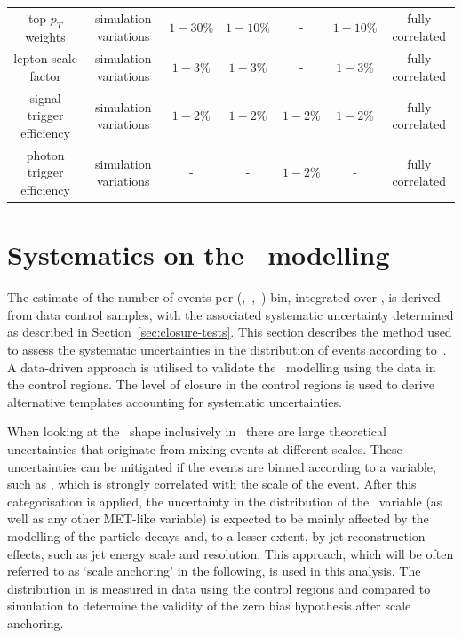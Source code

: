\begin{landscape}
\begin{table}[h!]
\begin{tabular}{ ccccccc }
    top $p_{T}$ weights & simulation variations & $1-30\%$  & $1-10\%$ & - & $1-10\%$ & fully correlated \\
    lepton scale factor & simulation variations & $1-3\%$ & $1-3\%$ & - & $1-3\%$ & fully correlated \\
    signal trigger efficiency & simulation variations & $1-2\%$ & $1-2\%$ & $1-2\%$ & $1-2\%$ & fully correlated \\
    photon trigger efficiency & simulation variations & - & - & $1-2\%$ & - & fully correlated \\
    \hline
    \hline
  \end{tabular}
\end{table}
\end{landscape}


\section{Systematics on the \mht~modelling}
\label{sec:syst-on-shape}

The estimate of the number of events per (\njet,~\nb,~\scalht) bin,
integrated over \mht, is derived from data control samples, with
the associated systematic uncertainty determined as 
described in Section~\ref{sec:closure-tests}. This section
describes the method used to assess the systematic uncertainties in
the distribution of events according to~\mht. A data-driven approach is
utilised to validate the \mht~modelling using the data in the control regions.
The level of closure in the control regions is used
to derive alternative templates accounting for systematic uncertainties.

When looking at the \mht~shape inclusively in \scalht~there are
large theoretical uncertainties that originate from mixing events
at different scales. These uncertainties can be mitigated if the events 
are binned according to a variable, such as \scalht, 
which is strongly correlated with the scale of the event. 
After this categorisation is applied, the uncertainty in 
the distribution of the \mht~variable
(as well as any other MET-like variable) is expected to be 
mainly affected by the modelling of the particle 
decays and, to a lesser extent, by jet reconstruction effects, 
such as jet energy scale and resolution. 
This approach, which will be often referred to as `scale anchoring'
in the following, is used in this analysis. The distribution in \mht
is measured in data using the control regions and compared to simulation
to determine the validity of the zero bias hypothesis after scale anchoring.

